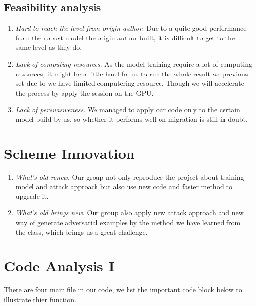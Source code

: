 \documentclass[
	letterpaper, %
	10pt, %
]{CSUniSchoolLabReport}
\begin{document}
\subsection{Feasibility analysis}
\begin{enumerate}
	\item \textit{Hard to reach the level from origin author}. Due to a quite good performance from the robust model the origin author built, it is difficult to get to the same level as they do.
	\item \textit{Lack of computing resources}. As the model training require a lot of computing resources, it might be a little hard for us to run the whole result we previous set due to we have limited computering resource. Though we will accelerate the process by apply the session on the GPU.
	\item \textit{Lack of persuasiveness}. We managed to apply our code only to the certain model build by us, so whether it performs well on migration is still in doubt.
\end{enumerate}

\section{Scheme Innovation}
\begin{enumerate}
	\item \textit{What's old renew}. Our group not only reproduce the project about training model and attack approach but also use new code and faster method to upgrade it.
	\item \textit{What's old brings new}. Our group also apply new attack approach and new way of generate adversarial examples by the method we have learned from the class, which brings us a great challenge.
\end{enumerate}

\section{Code Analysis I}
There are four main file in our code, we list the important code block below to illustrate thier function.
\end{document}
